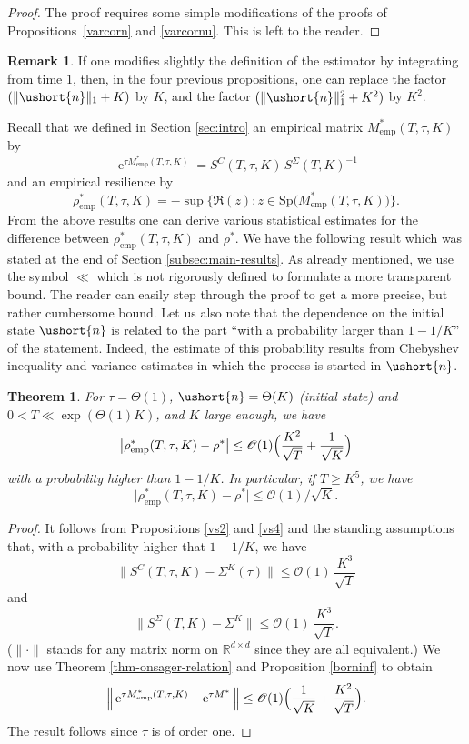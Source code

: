 \documentclass[JEP,XML,SOM,Unicode]{cedram}
\newcommand{\emp}{\mathrm{emp}}
\newcommand{\scaleto}[2]{#1}
\let\mathcal\mathscr
\numberwithin{equation}{section}
\theoremstyle{plain}
\newtheorem{theorem}{Theorem}[section]
\theoremstyle{definition}
\newtheorem{remark}{Remark}[section]
\newcommand{\Oun}{\mathcal{O}(1)}
\newcommand{\Thetaun}{\Theta(1)}
\newcommand{\sK}{K}
\newcommand{\Sp}{\mathrm{Sp}}
\newcommand{\vecn}{\ushort{n}}
\newcommand{\res}{\rho^*}
\newcommand{\e}{\operatorname{e}}
\newcommand{\norm}[1]{\|#1\|_{1}}\let\snorm\norm
\begin{document}
\begin{proof}
The proof requires some simple modifications of the proofs of Propositions~\ref{varcorn} and \ref{varcornu}. This is left to the reader.
\end{proof}

\begin{remark}
If one modifies slightly the definition of the estimator by integrating from time $1$,
then, in the four previous propositions, one can replace the factor \hbox{$(\norm{\vecn}+K)$} by $K$, and the factor
$(\norm{\vecn}^{2}+K^2)$ by $K^2$.
\end{remark}

Recall that we defined in Section \ref{sec:intro} an empirical matrix $M^{*}_\emp(T,\tau,K)$ by
\[
\e^{\tau M^{*}_\emp(T,\tau,K)}=S^{C}(T,\tau,K)\,S^{\Sigma}(T,K)^{-1}
\]
and an empirical resilience by
\[
\rho^*_\emp(T,\tau,K)=- \sup\{ \Re (z): z\in\Sp\bigl(M^{*}_\emp(T,\tau,K)\bigr)\}.
\]
From the above results one can derive various statistical estimates for the difference between $\rho^*_\emp(T,\tau,K)$
and $\res$. We have the following result which was stated at the end of Section \ref{subsec:main-results}. As already mentioned, we
use the symbol $\ll$ which is not rigorously defined to formulate a more transparent bound.
The reader can easily step through the proof to get a more precise, but rather cumbersome bound.
Let us also note that the dependence on the initial state $\vecn$ is related to the part ``with a probability larger than
$1-1/K$'' of the statement. Indeed, the estimate of this probability results from Chebyshev inequality and variance estimates in which the process is
started in $\vecn$.

\begin{theorem}\label{rhoemp}
For $\tau=\Theta(1)$, $\vecn=\Theta(K)$ (initial state) and $0<T\ll \exp(\Thetaun K)$,
and $K$ large enough, we have
\[
\big|\rho^*_\emp(T,\tau,K)-\res\big|\le
\Oun \Bigl(\frac{K^{2}}{\sqrt{T}} +\frac{1}{\sqrt{K}} \Bigr)
\]
with a probability higher than $1-1/K$.
In particular, if $T\geq K^{\scaleto{5}{4.5pt}} $, we have
\[
\big|\rho^*_\emp(T,\tau,K)-\res\big|\leq \Oun/\sqrt{K}.
\]
\end{theorem}

\begin{proof}
It follows from Propositions \ref{vs2} and \ref{vs4} and the standing assumptions that, with a probability higher that $1-1/K$, we have
\[
\|S^{C}(T,\tau,K)-\Sigma^{\sK}(\tau)\|\leq \Oun\, \frac{K^{\scaleto{3}{4pt}}}{\sqrt{T}}
\]
and
\[
\|S^{{ \Sigma}}(T,K)-\Sigma^{\sK}\|\leq \Oun \, \frac{K^{\scaleto{3}{4.5pt}}}{\sqrt{T}}.
\]
($\|\cdot\|$ stands for any matrix norm on $\mathds{R}^{d\times d}$ since they are all equivalent.)
We now use Theorem \ref{thm-onsager-relation} and Proposition \ref{borninf} to obtain
\[
\Big\| \e^{\tau M^{*}_\emp(T,\tau,K)}-\e^{\tau M^{*}}\Big\|\leq \Oun \Bigl(\frac{1}{\sqrt{K}}+ \frac{K^2}{\sqrt{T}} \Bigr).
\]
The result follows since $\tau$ is of order one.
\end{proof}
\end{document}
